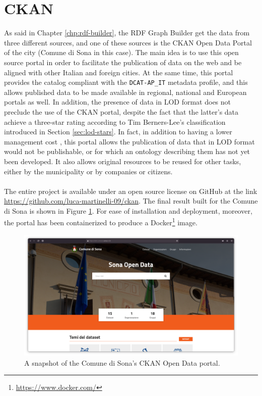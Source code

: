 \section{CKAN}
\label{sec:ckan-webapp}

As said in Chapter \ref{chp:rdf-builder}, the \ac{RDF} Graph Builder get the data from three different sources, and one of these sources is the CKAN Open Data Portal of the city (Comune di Sona in this case). The main idea is to use this open source portal in order to facilitate the publication of data on the web and be aligned with other Italian and foreign cities. At the same time, this portal provides the catalog  compliant with the \verb#DCAT-AP_IT# metadata profile, and this allows published data to be made available in regional, national and European portals as well. In addition, the presence of data in \acl{LOD} format does not preclude the use of the CKAN portal, despite the fact that the latter's data achieve a three-star rating according to Tim Berners-Lee's classification introduced in Section \ref{sec:lod-stars}. In fact, in addition to having a lower management cost \cite{bauer2011linked}, this portal allows the publication of data that in \acl{LOD} format would not be publishable, or for which an ontology describing them has not yet been developed. It also allows original resources to be reused for other tasks, either by the municipality or by companies or citizens.

\paragraph*{}
The entire project is available under an open source license on GitHub at the link \url{https://github.com/luca-martinelli-09/ckan}. The final result built for the Comune di Sona is shown in Figure \ref{fig:ckan-sona}. For ease of installation and deployment, moreover, the portal has been containerized to produce a Docker\footnote{\url{https://www.docker.com/}} image.

\begin{figure}[!ht]
  \centering
  \includegraphics[width=\columnwidth]{images/ckan/ckan-sona}
  \caption{A snapshot of the Comune di Sona's CKAN Open Data portal.}
  \label{fig:ckan-sona}
\end{figure}

